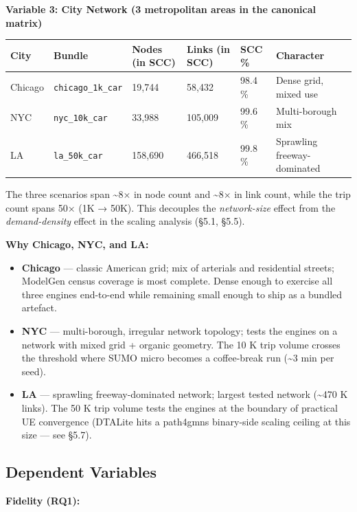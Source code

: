 \textbf{Variable 3: City Network (3 metropolitan areas in the canonical
matrix)}

\begin{longtable}[]{@{}llllll@{}}
\toprule\noalign{}
City & Bundle & Nodes (in SCC) & Links (in SCC) & SCC \% & Character \\
\midrule\noalign{}
\endhead
\bottomrule\noalign{}
\endlastfoot
Chicago & \texttt{chicago\_1k\_car} & 19,744 & 58,432 & 98.4 \% & Dense
grid, mixed use \\
NYC & \texttt{nyc\_10k\_car} & 33,988 & 105,009 & 99.6 \% &
Multi-borough mix \\
LA & \texttt{la\_50k\_car} & 158,690 & 466,518 & 99.8 \% & Sprawling
freeway-dominated \\
\end{longtable}

The three scenarios span \textasciitilde8× in node count and
\textasciitilde8× in link count, while the trip count spans 50× (1K →
50K). This decouples the \emph{network-size} effect from the
\emph{demand-density} effect in the scaling analysis (§5.1, §5.5).

\textbf{Why Chicago, NYC, and LA:}

\begin{itemize}
\tightlist
\item
  \textbf{Chicago} --- classic American grid; mix of arterials and
  residential streets; ModelGen census coverage is most complete. Dense
  enough to exercise all three engines end-to-end while remaining small
  enough to ship as a bundled artefact.
\item
  \textbf{NYC} --- multi-borough, irregular network topology; tests the
  engines on a network with mixed grid + organic geometry. The 10 K trip
  volume crosses the threshold where SUMO micro becomes a coffee-break
  run (\textasciitilde3 min per seed).
\item
  \textbf{LA} --- sprawling freeway-dominated network; largest tested
  network (\textasciitilde470 K links). The 50 K trip volume tests the
  engines at the boundary of practical UE convergence (DTALite hits a
  path4gmns binary-side scaling ceiling at this size --- see §5.7).
\end{itemize}

\subsection{Dependent Variables}\label{413-dependent-variables}

\textbf{Fidelity (RQ1):}

